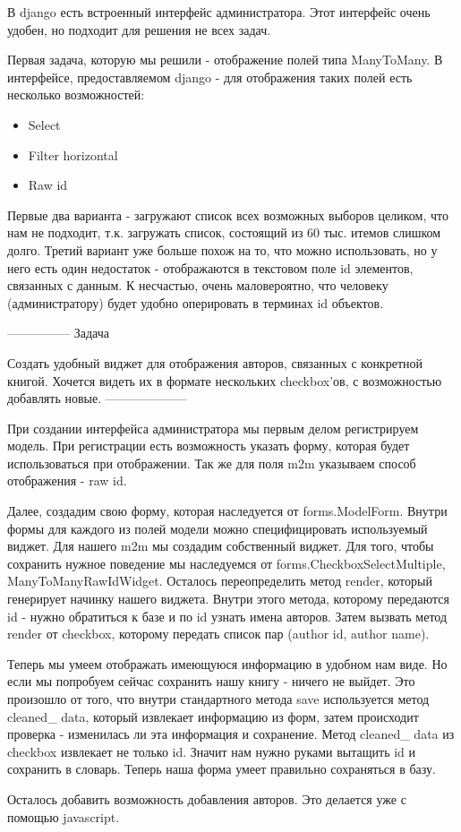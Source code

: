 \documentclass[a4paper]{report}
\begin{document}

В django есть встроенный интерфейс администратора. Этот интерфейс очень удобен, но
подходит для решения не всех задач. 

Первая задача, которую мы решили - отображение полей типа ManyToMany. В 
интерфейсе, предоставляемом django - для отображения таких полей есть несколько 
возможностей:
\begin{itemize}
\item Select
\item Filter horizontal
\item Raw id
\end{itemize}
Первые два варианта - загружают список всех возможных выборов целиком, что нам 
не подходит, т.к. загружать список, состоящий из 60 тыс. итемов слишком долго.
Третий вариант уже больше похож  на то, что можно использовать, но у него есть
один недостаток - отображаются в текстовом поле id элементов, связанных с данным.
К несчастью, очень маловероятно, что человеку (администратору) будет удобно 
оперировать в терминах id объектов.

---------------
Задача

Создать удобный виджет для отображения авторов, связанных с конкретной книгой.
Хочется видеть их в формате нескольких checkbox'ов, с возможностью добавлять
новые.
--------------------

При создании интерфейса администратора мы первым делом регистрируем модель. При 
регистрации есть возможность указать форму, которая будет использоваться при
отображении. Так же для поля m2m указываем способ отображения - raw id.

Далее, создадим свою форму, которая наследуется от forms.ModelForm.
Внутри формы для каждого из полей модели можно специфицировать используемый 
виджет. Для нашего m2m мы создадим собственный виджет. Для того, чтобы сохранить 
нужное поведение мы наследуемся от forms.CheckboxSelectMultiple, 
ManyToManyRawIdWidget. Осталось переопределить метод render, который генерирует 
начинку нашего виджета. Внутри этого метода, которому передаются id - нужно
обратиться к  базе и по id узнать имена авторов. Затем вызвать метод render
от checkbox, которому передать список пар (author id, author name).

Теперь мы умеем отображать имеющуюся информацию в удобном нам виде. Но если мы 
попробуем сейчас сохранить нашу книгу - ничего не выйдет. Это произошло от того, 
что внутри стандартного метода save используется метод cleaned\_ data, который 
извлекает информацию из форм, затем происходит проверка - изменилась ли эта 
информация и сохранение. Метод cleaned\_ data из checkbox извлекает не только id.
Значит нам нужно руками вытащить id и сохранить в словарь. Теперь наша форма
умеет правильно сохраняться в базу.

Осталось добавить возможность добавления авторов. Это делается уже с помощью 
javascript. 

 
\end{document}
